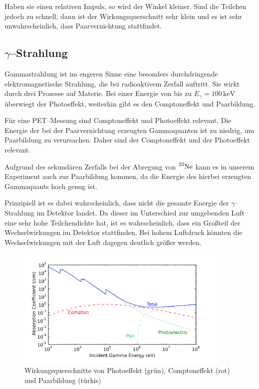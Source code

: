 \documentclass[12pt,a4paper]{scrartcl}
\numberwithin{equation}{section} %
\newcommand{\pu}[1]{\ensuremath{\mathrm{#1}}}
\begin{document}
Haben sie einen relativen Impuls, so wird der Winkel kleiner. Sind die Teilchen jedoch zu schnell, dann ist der Wirkungsquerschnitt sehr klein und es ist sehr unwahrscheinlich, dass Paarvernichtung stattfindet.

\hypertarget{gammastrahlung}{%
\subsection{\texorpdfstring{$\gamma$--Strahlung}{\textbackslash gamma--Strahlung}}\label{gammastrahlung}}

Gammastrahlung ist im engeren Sinne eine besonders durchdringende elektromagnetische Strahlung, die bei radioaktivem Zerfall auftritt. Sie wirkt durch drei Prozesse auf Materie. Bei einer Energie von bis zu $E_\gamma = \pu{100\, keV}$ überwiegt der Photoeffekt, weiterhin gibt es den Comptoneffekt und Paarbildung.

Für eine PET--Messung sind Comptoneffekt und Photoeffekt relevant. Die Energie der bei der Paarvernichtung erzeugten Gammaquanten ist zu niedrig, um Paarbildung zu verursachen. Daher sind der Comptoneffekt und der Photoeffekt relevant.

Aufgrund des sekundären Zerfalls bei der Abregung von $\ce{^{22}Ne}$ kann es in unserem Experiment auch zur Paarbildung kommen, da die Energie des hierbei erzeugten Gammaquants hoch genug ist.

Prinzipiell ist es dabei wahrscheinlich, dass nicht die gesamte Energie der $\gamma$--Strahlung im Detektor landet. Da dieser im  Unterschied zur umgebenden Luft eine sehr hohe Teilchendichte hat, ist es wahrscheinlich, dass ein Großteil der Wechselwirkungen im Detektor stattfinden. Bei hohem Luftdruck könnten die Wechselwirkungen mit der Luft dagegen deutlich größer werden.

\begin{figure}[h]
	\centering
	\includegraphics[width=0.9\textwidth]{../media/B3.4/1024px-Pb-gamma-xs.svg.png}
	\caption{Wirkungsquerschnitte von Photoeffekt (grün), Comptoneffekt (rot) und Paarbildung (türkis) \cite{abb:Wirkungsquerschnitte}}
	\label{fig:Wirkungsquerschnitte }
\end{figure}
\end{document}
